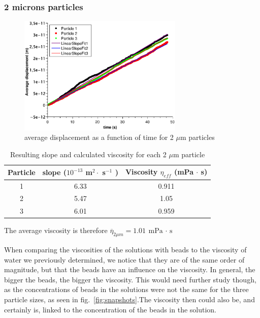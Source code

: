 \documentclass{article}
\begin{document}
\subsubsection{2 microns particles}
\begin{figure}[H]
    \centering
    \includegraphics[width=0.7\textwidth]{qti/2microns.eps}
    \caption{average displacement as a function of time for 2 $\mu$m particles}
    \label{fig:2microns}
\end{figure}

\begin{table}[H]
    \centering
    \begin{tabular}{c|c|c}
       Particle  & slope ($10^{-13}$ m$^2 \cdot$ s$^{-1}$ ) & Viscosity $\eta_{eff}$ (mPa $\cdot$ s) \\
       \hline
        1 & 6.33 & 0.911\\
        2 & 5.47 & 1.05 \\
        3 & 6.01 & 0.959
    \end{tabular}
    \caption{Resulting slope and calculated viscosity for each 2 $\mu$m particle }
    \label{tab:viscosity2micron}
\end{table}
The average viscosity is therefore $\boxed{\overline{\eta}_{2\mu m} = 1.01 \ \text{mPa $\cdot$ s}}$ \medskip

When comparing the viscosities of the solutions with beads to the viscosity of water we previously determined, we notice that they are of the same order of magnitude, but that the beads have an influence on the viscosity. In general, the bigger the beads, the bigger the viscosity. This would need further study though, as the concentrations of beads in the solutions were not the same for the three particle sizes, as seen in fig.~\ref{fig:snapshots}.The viscosity then could also be, and certainly is, linked to the concentration of the beads in the solution.\vspace{0.5cm}
\end{document}
